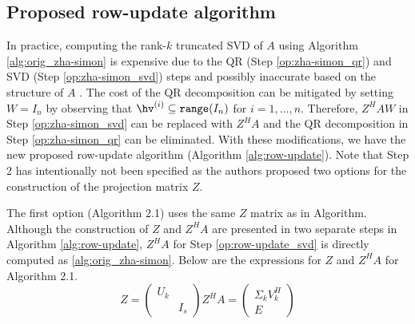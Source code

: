 \subsection{Proposed row-update algorithm}

In practice, computing the rank-$k$ truncated SVD of $A$ using Algorithm \ref{alg:orig_zha-simon} is expensive due to the QR (Step \ref{op:zha-simon_qr}) and SVD (Step \ref{op:zha-simon_svd}) steps and possibly inaccurate based on the structure of $A$ \cite{Kalantzis2021}. The cost of the QR decomposition can be mitigated by setting $W=I_n$ by observing that $\hv^{(i)}\subseteq\verb+range+(I_n)$ for $i=1,\dots,n$. Therefore, $Z^H AW$ in Step \ref{op:zha-simon_svd} can be replaced with $Z^H A$ and the QR decomposition in Step \ref{op:zha-simon_qr} can be eliminated. With these modifications, we have the new proposed row-update algorithm (Algorithm \ref{alg:row-update}). Note that Step 2 has intentionally not been specified as the authors proposed two options for the construction of the projection matrix $Z$. 

The first option (Algorithm 2.1) uses the same $Z$ matrix as in Algorithm. Although the construction of $Z$ and $Z^H A$ are presented in two separate steps in Algorithm \ref{alg:row-update}, $Z^H A$ for Step \ref{op:row-update_svd} is directly computed as  \ref{alg:orig_zha-simon}. Below are the expressions for $Z$ and $Z^H A$ for Algorithm 2.1.
\begin{subequations}\label{eq:zha-simon_matrices}
\begin{equation}
  Z=\begin{pmatrix} U_k & \\ & I_s \end{pmatrix}
  \label{eq:zha-simon_Z}
\end{equation}
\begin{equation}
  Z^H A =
  \begin{pmatrix}
  \Sigma_k V_k^H \\
  E
  \end{pmatrix}
  \label{eq:zha-simon_ZHA}
\end{equation}
\end{subequations}


